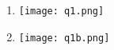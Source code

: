 \begin{question}

    \begin{enumerate}[label=\textbf{\alph*})]
        \item 
        \begin{minipage}{\textwidth}
            \centering 
            \texttt{[image: q1.png]}
        \end{minipage}
        \item 
        \begin{minipage}{\textwidth}
            \centering 
            \texttt{[image: q1b.png]}
        \end{minipage}

    \end{enumerate}	
	
\end{question}